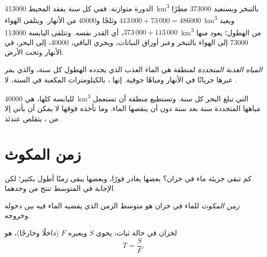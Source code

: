 الدورة متوازنة. ففي كل سنة يفقد المحيط \num{413000}~\unit{km^3} بالتبخر ويستعيد
\num{373000} مطرًا وثلجًا و\num{40000} من الأنهار. ويتلقى الهواء
$413\,000 + 73\,000 = \num{486000}$~\unit{km^3}
ويعيد $373\,000 + 113\,000$، أي القدر نفسه. وتتلقى اليابسة
\num{113000}~\unit{km^3} من الهطول؛ يعود منها \num{73000} إلى الهواء بالتبخر
وعبر أوراق النباتات، ويجري الباقي، \num{40000}، إلى البحر، في الأنهار
وتحت الأرض.

\begin{definition}\label{def:g10:freshwater-resources:renewable}
\emph{المياه العذبة المتجددة} لمنطقة هي  الماء العذب
الذي يجدده الهطول كل سنة، والذي يمر عبرها جريانًا في الأنهار ومياهًا جوفية. إنها
، بالكيلومترات المكعبة في السنة، لا .
\end{definition}

لليابسة كلها، هي \num{40000}~\unit{km^3} التي تبلغ البحر كل سنة. وتستطيع
منطقة أن تستعمل مياهها المتجددة سنة بعد سنة دون أن ينقصها الماء. وما تأخذه فوقها لا
يمكن أن يأتي إلا من ، يتقلص
عندئذ.

\section{زمن المكوث}

كم تبقى جزيئة ماء في خزان؟ بعضها يغادر فورًا، وبعضها يبقى زمنًا أطول بكثير؛ لكن
الإجابة في المتوسط تنتج من  
وحدهما.

\begin{definition}\label{def:g10:freshwater-resources:residence-time}
\emph{زمن المكوث} للماء في خزان هو متوسط الزمن الذي يقضيه
الماء فيه بين دخوله وخروجه.
\end{definition}

\begin{proposition}\label{prop:g10:freshwater-resources:residence}
لخزان في حالة ثبات، يحوي  $S$ ويعبره  $F$
(داخلًا وخارجًا)،  هو
\[
T = \frac{S}{F}.
\]
\end{proposition}

